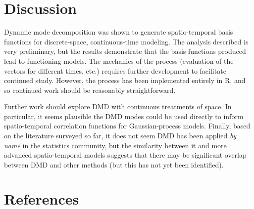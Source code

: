 \documentclass[review,number,sort&compress,12pt]{elsarticle}
\begin{document}
\section{Discussion}
\label{sec:discusion}

Dynamic mode decomposition was shown to generate spatio-temporal basis functions for discrete-space, continuous-time modeling.
The analysis described is very preliminary, but the results demonstrate that the basis functions produced lead to functioning models.
The mechanics of the process (evaluation of the vectors for different times, etc.) requires further development to facilitate continued study.
However, the process has been implemented entirely in R, and so continued work should be reasonably straightforward.

Further work should explore DMD with continuous treatments of space. 
In particular, it seems plausible the DMD modes could be used directly to inform spatio-temporal correlation functions for Gaussian-process models.
Finally, based on the literature surveyed so far, it does not seem DMD has been applied {\it by name} in the statistics community, but the similarity between it and more advanced spatio-temporal models suggests that there may be significant overlap between DMD and other methods (but this has not yet been identified).

\section*{References}
 

\end{document}
